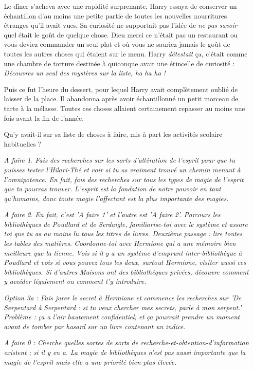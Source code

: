 Le dîner s'acheva avec une rapidité surprenante. Harry essaya de conserver un échantillon d'au moins une petite partie de toutes les nouvelles nourritures étranges qu'il avait vues. Sa curiosité ne supportait pas l'idée de \emph{ne pas savoir}  quel était le goût de quelque chose. Dieu merci ce n'était pas un restaurant ou vous deviez commander un seul plat et où vous ne sauriez jamais le goût de toutes les autres choses qui étaient sur le menu. Harry \emph{détestait}  ça, c'était comme une chambre de torture destinée à quiconque avait une étincelle de curiosité : \emph{Découvres un seul des mystères sur la liste, ha ha ha !} 

Puis ce fut l'heure du dessert, pour lequel Harry avait complètement oublié de laisser de la place. Il abandonna après avoir échantillonné un petit morceau de tarte à la mélasse. Toutes ces choses allaient certainement repasser au moins une fois avant la fin de l'année.

Qu'y avait-il sur sa liste de choses à faire, mis à part les activités scolaire habituelles ?

\emph{A faire 1. Fais des recherches sur les sorts d'altération de l'esprit pour que tu puisses tester l'Hilari-Thé et voir si tu as vraiment trouvé un chemin menant à l'omnipotence. En fait, fais des recherches sur tous les types de magie de l'esprit que tu pourras trouver. L'esprit est la fondation de notre pouvoir en tant qu'humains, donc toute magie l'affectant est la plus importante des magies.} 

\emph{A faire 2. En fait, c'est 'A faire 1' et l'autre est 'A faire 2'. Parcours les bibliothèques de Poudlard et de Serdaigle, familiarise-toi avec le système et assure toi que tu as au moins lu tous les titres de livres. Deuxième passage : lire toutes les tables des matières. Coordonne-toi avec Hermione qui a une mémoire bien meilleure que la tienne. Vois si il y a un système d'emprunt inter-bibliothèque à Poudlard et vois si vous pouvez tous les deux, surtout Hermione, visiter aussi ces bibliothèques. Si d'autres Maisons ont des bibliothèques privées, découvre comment y accéder légalement ou comment t'y introduire.} 

\emph{Option 3a : Fais jurer le secret à Hermione et commence les recherches sur 'De Serpentard à Serpentard : si tu veux chercher mes secrets, parle à mon serpent.' Problème : ça a l'air hautement confidentiel, et ça pourrait prendre un moment avant de tomber par hasard sur un livre contenant un indice.} 

\emph{A faire 0 : Cherche quelles sortes de sorts de recherche-et-obtention-d'information existent ; si il y en a. La magie de bibliothèques n'est pas aussi importante que la magie de l'esprit mais elle a une priorité bien plus élevée.} 

